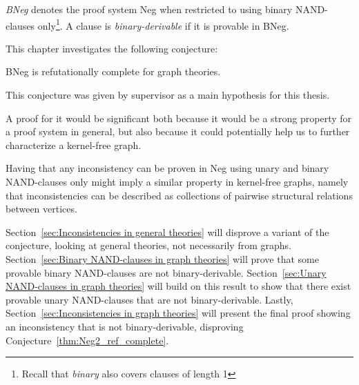 

\begin{definition}
  \textit{BNeg} denotes the proof system Neg when restricted to using binary NAND-clauses only\footnote{Recall that \textit{binary} also covers clauses of length 1}.
  A clause is \textit{binary-derivable} if it is provable in BNeg.
\end{definition}
This chapter investigates the following conjecture:
\begin{conjecture}
  BNeg is refutationally complete for graph theories.
  \label{thm:Neg2_ref_complete}
\end{conjecture}
This conjecture was given by supervisor as a main hypothesis for this thesis.

A proof for it would be significant both because it would be a strong property for a proof system in general, but also because it could potentially help us to further characterize a kernel-free graph.

Having that any inconsistency can be proven in Neg using unary and binary NAND-clauses only might imply a similar property in kernel-free graphs, namely that inconsistencies can be described as collections of pairwise structural relations between vertices.

Section~\ref{sec:Inconsistencies in general theories} will disprove a variant of the conjecture, looking at general theories, not necessarily from graphs.
Section~\ref{sec:Binary NAND-clauses in graph theories} will prove that some provable binary NAND-clauses are not binary-derivable.
Section~\ref{sec:Unary NAND-clauses in graph theories} will build on this result to show that there exist provable unary NAND-clauses that are not binary-derivable.
Lastly, Section~\ref{sec:Inconsistencies in graph theories} will present the final proof showing an inconsistency that is not binary-derivable, disproving Conjecture~\ref{thm:Neg2_ref_complete}.
